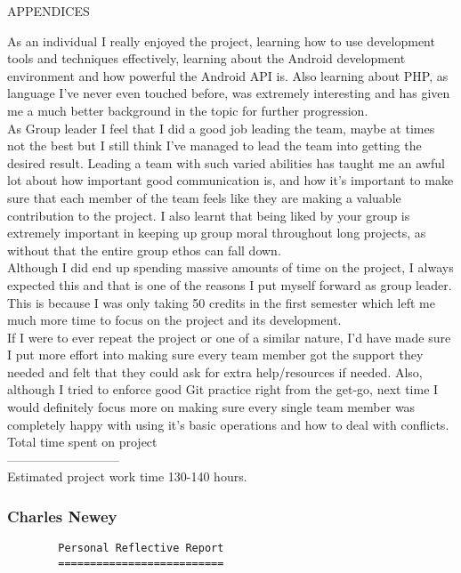 \documentclass{article}
\begin{document}
\begin{section}{APPENDICES}
\begin{tt}
				As an individual I really enjoyed the project, learning how to use development tools and techniques effectively, learning about the Android development environment and how powerful the Android API is. Also learning about PHP, as language I've never even touched before, was extremely interesting and has given me a much better background in the topic for further progression. \\
				As Group leader I feel that I did a good job leading the team, maybe at times not the best but I still think I've managed to lead the team into getting the desired result. Leading a team with such varied abilities has taught me an awful lot about how important good communication is, and how it's important to make sure that each member of the team feels like they are making a valuable contribution to the project. I also learnt that being liked by your group is extremely important in keeping up group moral throughout long projects, as without that the entire group ethos can fall down. \\

				Although I did end up spending massive amounts of time on the project, I always expected this and that is one of the reasons I put myself forward as group leader. This is because I was only taking 50 credits in the first semester which left me much more time to focus on the project and its development. \\

				If I were to ever repeat the project or one of a similar nature, I'd have made sure I put more effort into making sure every team member got the support they needed and felt that they could ask for extra help/resources if needed. Also, although I tried to enforce good Git practice right from the get-go, next time I would definitely focus more on making sure every single team member was completely happy with using it's basic operations and how to deal with conflicts. \\

				Total time spent on project \\
				--------------------------- \\
				Estimated project work time 130-140 hours. \\
				\end{tt}
		
		\clearpage	
		\subsubsection{Charles Newey}
		\begin{verbatim}
		Personal Reflective Report
		==========================


\end{verbatim}
\end{section}
\end{document}
